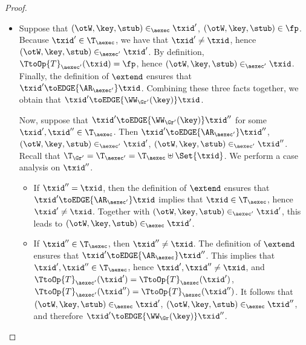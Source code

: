 \begin{proof}
\begin{enumerate}
\begin{itemize}
\item Suppose that $(\otW, \key, \stub) \in_{\aexec} \txid'$, $(\otW, \key, \stub) \in \fp$. Because $\txid' \in \T_{\aexec}$, 
we have that $\txid' \neq \txid$, hence $(\otW, \key, \stub) \in_{\aexec' }\txid'$. By definition, 
$\TtoOp{T}_{\aexec'}(\txid) = \fp$, hence $(\otW, \key, \stub) \in_{\aexec'} \txid$. Finally, 
the definition of $\extend$ ensures that $\txid' \toEDGE{\AR_{\aexec'}} \txid$. Combining 
these three facts together, we obtain that  
$\txid' \toEDGE{\WW_{\Gr'}(\key)} \txid$. 

Now, suppose that $\txid' \toEDGE{\WW_{\Gr'}(\key)} \txid''$ for some $\txid', \txid'' \in \T_{\aexec}$. 
Then $\txid' \toEDGE{\AR_{\aexec'}} \txid''$, $(\otW, \key, \stub) \in_{\aexec'} \txid'$, $(\otW, \key, \stub) 
\in_{\aexec'} \txid''$. 
Recall that $\T_{\Gr'} = \T_{\aexec'} = \T_{\aexec} \uplus \Set{ \txid }$. We perform a case analysis on $\txid''$. 

\begin{itemize}

\item If $\txid'' = \txid$, then the definition of $\extend$ ensures that $\txid' \toEDGE{\AR_{\aexec'}} \txid$ 
implies that $\txid \in \T_{\aexec}$, hence $\txid' \neq \txid$. 
Together with $(\otW, \key, \stub) \in_{\aexec'} 
\txid'$, this leads to $(\otW, \key, \stub) \in_{\aexec} \txid'$. 

\item If $\txid'' \in \T_{\aexec}$, then $\txid'' \neq \txid$. The definition of $\extend$ ensures that $\txid' \toEDGE{\AR_{\aexec}} \txid''$. 
This implies that $\txid', \txid'' \in \T_{\aexec}$, hence $\txid', \txid'' \neq \txid$, and $\TtoOp{T}_{\aexec'}(\txid') = \TtoOp{T}_{\aexec}(\txid')$, 
$\TtoOp{T}_{\aexec'}(\txid'') = \TtoOp{T}_{\aexec}(\txid'')$. It follows that $(\otW, \key, \stub) \in_{\aexec} \txid'$, 
$(\otW, \key, \stub) \in_{\aexec} \txid''$, and therefore $\txid' \toEDGE{\WW_{\Gr}(\key)} \txid''$.

\end{itemize}
\end{itemize}
\end{enumerate}
\end{proof}


